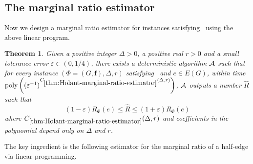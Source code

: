 \documentclass[11pt]{article}
\newtheorem{theorem}{Theorem}
\def\poly{\mathrm{poly}}
\newcommand{\wh}[1]{\widehat{#1}}
\newcommand{\vecf}{\boldsymbol{f}}
\renewcommand{\Pr}[2][]{ \ifthenelse{\isempty{#1}}
  {\mathbf{Pr}\left[#2\right]} {\mathbf{Pr}_{#1}\left[#2\right]} }
\begin{document}
\subsection{The marginal ratio estimator}

Now we design a marginal ratio estimator for instances satisfying~ using the above linear program.


\begin{theorem} \label{thm:Holant-marginal-ratio-estimator}
    Given a positive integer $\Delta > 0$, a positive real $r > 0$ and a small tolerance error $\varepsilon \in (0, 1/4)$, there exists a deterministic algorithm $\mathcal{A}$ such that for every instance $(\Phi = (G, \vecf), \Delta, r)$ satisfying~ and $e \in E(G)$, within time $\poly\left((\varepsilon^{-1})^{C_{\ref{thm:Holant-marginal-ratio-estimator}}(\Delta, r)}\right)$, $\mathcal{A}$ outputs a number $\wh{R}$ such that
    $$
        (1 - \varepsilon) R_{\Phi}(e) \le \wh{R} \le (1 + \varepsilon) R_{\Phi}(e)
    $$
    where $C_{\ref{thm:Holant-marginal-ratio-estimator}}(\Delta, r)$ and coefficients in the polynomial depend only on $\Delta$ and $r$.
\end{theorem}

The key ingredient is the following estimator for the marginal ratio of a half-edge via linear programming.
\end{document}
